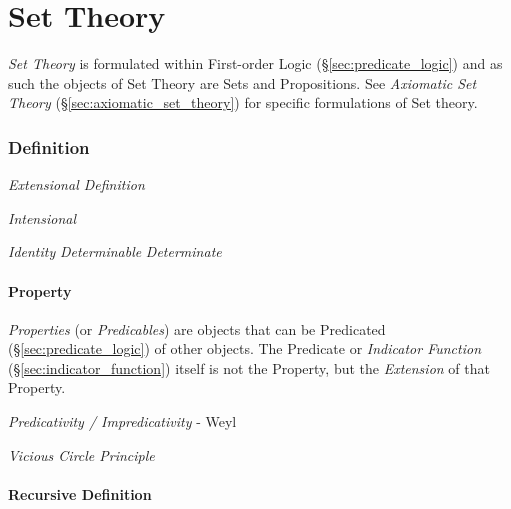 \part{Set Theory}\label{sec:set_theory}

\emph{Set Theory} is formulated within First-order Logic
(\S\ref{sec:predicate_logic}) and as such the objects of Set Theory
are Sets and Propositions. See \emph{Axiomatic Set Theory}
(\S\ref{sec:axiomatic_set_theory}) for specific formulations of Set
theory.



\section{Definition}\label{sec:set_definition}

\emph{Extensional Definition}

\emph{Intensional}

\emph{Identity} \emph{Determinable} \emph{Determinate}

\subsection{Property}\label{sec:set_property}

\emph{Properties} (or \emph{Predicables}) are objects that can be
Predicated (\S\ref{sec:predicate_logic}) of other objects. The
Predicate or \emph{Indicator Function}
(\S\ref{sec:indicator_function}) itself is not the Property, but
the \emph{Extension} of that Property.

\emph{Predicativity / Impredicativity} - Weyl

\emph{Vicious Circle Principle}



\subsection{Recursive Definition}\label{sec:recursive_definition}

